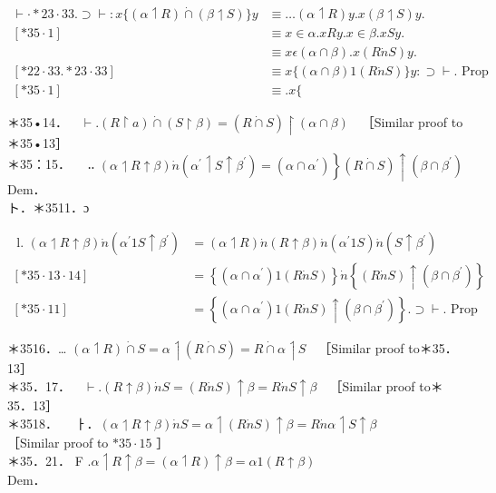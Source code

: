 \documentclass[10pt]{article}
\begin{document}
$$
\begin{array}{ll}
\vdash \cdot * 23 \cdot 33 . \supset \vdash: x\{(\alpha \upharpoonleft R) \dot{\cap}(\beta \upharpoonleft S)\} y & \equiv \ldots(\alpha \upharpoonleft R) y . x(\beta \upharpoonleft S) y . \\
{[* 35 \cdot 1]} & \equiv x \in \alpha . x R y . x \in \beta . x S y . \\
& \equiv x \epsilon(\alpha \cap \beta) . x(R \dot{n} S) y . \\
{[* 22 \cdot 33 . * 23 \cdot 33]} & \equiv x\{(\alpha \cap \beta) 1(R \dot{n} S)\} y: \supset \vdash . \text { Prop } \\
{[* 35 \cdot 1]} & \equiv . x\{
\end{array}
$$

＊35•14．$\quad \vdash .(R \upharpoonright a) \dot{\cap}(S \upharpoonright \beta)=(R \dot{\cap} S) \upharpoonright(\alpha \cap \beta) \quad$［Similar proof to＊35•13］\\
＊35：15．$\quad$ ‥ $\left.(\alpha \upharpoonleft R \uparrow \beta) \dot{n}\left(\alpha^{\prime} \upharpoonleft S \uparrow \beta^{\prime}\right)=\left(\alpha \cap \alpha^{\prime}\right)\right\}(R \dot{\cap} S) \uparrow\left(\beta \cap \beta^{\prime}\right)$\\
Dem．\\
ト．＊3511．ɔ

$$
\begin{array}{ll}
\text { l. }(\alpha \upharpoonleft R \uparrow \beta) \dot{n}\left(\alpha^{\prime} 1 S \uparrow \beta^{\prime}\right) & =(\alpha \upharpoonleft R) \dot{n}(R \uparrow \beta) \dot{n}\left(\alpha^{\prime} 1 S\right) \dot{n}\left(S \uparrow \beta^{\prime}\right) \\
{[* 35 \cdot 13 \cdot 14]} & =\left\{\left(\alpha \cap \alpha^{\prime}\right) 1(R \dot{n} S)\right\} \dot{n}\left\{(R \dot{n} S) \uparrow\left(\beta \cap \beta^{\prime}\right)\right\} \\
{[* 35 \cdot 11]} & =\left\{\left(\alpha \cap \alpha^{\prime}\right) 1(R \dot{n} S) \uparrow\left(\beta \cap \beta^{\prime}\right)\right\} . \supset \vdash . \text { Prop }
\end{array}
$$

＊3516．… $(\alpha \upharpoonleft R) \dot{\cap} S=\alpha \upharpoonleft(R \dot{\cap} S)=R \dot{\cap} \alpha \upharpoonleft S \quad$［Similar proof to＊35．13］\\
＊35．17．$\quad \vdash .(R \uparrow \beta) \dot{n} S=(R \dot{n} S) \uparrow \beta=R \dot{n} S \uparrow \beta \quad$［Similar proof to＊35．13］\\
＊3518．$\quad$ ㅏ．$(\alpha \upharpoonleft R \uparrow \beta) \dot{n} S=\alpha \upharpoonleft(R \dot{n} S) \uparrow \beta=R \dot{n} \alpha \upharpoonleft S \uparrow \beta$\\
［Similar proof to $* 35 \cdot 15$ ］\\
＊35．21． F $. \alpha \upharpoonleft R \uparrow \beta=(\alpha \upharpoonleft R) \uparrow \beta=\alpha 1(R \uparrow \beta)$\\
Dem．
\end{document}
